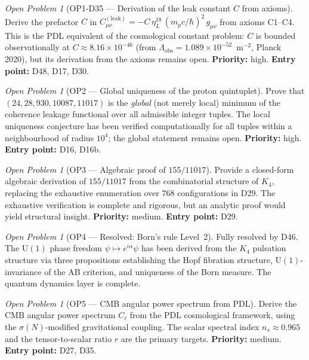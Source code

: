 \documentclass[11pt,a4paper]{article}
\theoremstyle{plain}
\theoremstyle{definition}
\theoremstyle{remark}
\newtheorem{openproblem}[theorem]{Open Problem}
\newcommand{\sigmaN}{\sigma(N)}
\begin{document}
\begin{openproblem}[OP1-D35 --- Derivation of the leak constant $C$ from axioms]
\label{op:leakconstant}
Derive the prefactor $C$ in $C^{(\mathrm{leak})}_{\mu\nu} = -C\,\eta_L^{18}\,(m_p c/\hbar)^2\,g_{\mu\nu}$ from axioms C1--C4. This is the PDL equivalent of the cosmological constant problem: $C$ is bounded observationally at $C \approx 8.16\times10^{-46}$ (from $\Lambda_{\mathrm{obs}} = 1.089\times10^{-52}$~m$^{-2}$, Planck 2020), but its derivation from the axioms remains open. \textbf{Priority:} high. \textbf{Entry point:} D48, D17, D30.
\end{openproblem}

\begin{openproblem}[OP2 --- Global uniqueness of the proton quintuplet]
\label{op:uniqueness}
Prove that $(24, 28, 930, 10087, 11017)$ is the \emph{global} (not merely local) minimum of the coherence leakage functional over all admissible integer tuples. The local uniqueness conjecture has been verified computationally for all tuples within a neighbourhood of radius $10^4$; the global statement remains open. \textbf{Priority:} high. \textbf{Entry point:} D16, D16b.
\end{openproblem}

\begin{openproblem}[OP3 --- Algebraic proof of $155/11017$]
\label{op:gate1algebraic}
Provide a closed-form algebraic derivation of $155/11017$ from the combinatorial structure of $K_4$, replacing the exhaustive enumeration over $768$ configurations in D29. The exhaustive verification is complete and rigorous, but an analytic proof would yield structural insight. \textbf{Priority:} medium. \textbf{Entry point:} D29.
\end{openproblem}

\begin{openproblem}[OP4 --- Resolved: Born's rule Level~2]
\label{op:bornlevel2}
\textcolor{proofblue}{Fully resolved by D46.} The $\mathrm{U}(1)$ phase freedom $\psi \mapsto e^{i\alpha}\psi$ has been derived from the $K_4$ pulsation structure via three propositions establishing the Hopf fibration structure, $\mathrm{U}(1)$-invariance of the AB criterion, and uniqueness of the Born measure. The quantum dynamics layer is complete.
\end{openproblem}

\begin{openproblem}[OP5 --- CMB angular power spectrum from PDL]
\label{op:CMBspectrum}
Derive the CMB angular power spectrum $C_\ell$ from the PDL cosmological framework, using the $\sigmaN$-modified gravitational coupling. The scalar spectral index $n_s \approx 0.965$ and the tensor-to-scalar ratio $r$ are the primary targets. \textbf{Priority:} medium. \textbf{Entry point:} D27, D35.
\end{openproblem}
\end{document}
